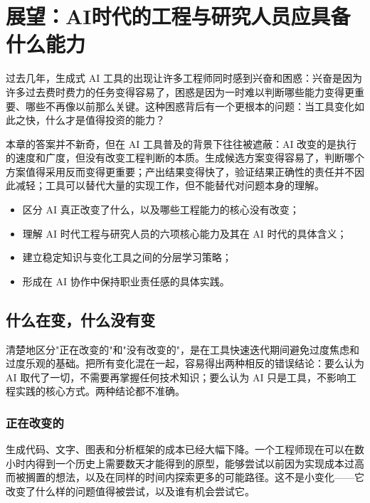 \chapter{展望：AI时代的工程与研究人员应具备什么能力}

过去几年，生成式 AI 工具的出现让许多工程师同时感到兴奋和困惑：兴奋是因为许多过去费时费力的任务变得容易了，困惑是因为一时难以判断哪些能力变得更重要、哪些不再像以前那么关键。这种困惑背后有一个更根本的问题：当工具变化如此之快，什么才是值得投资的能力？

本章的答案并不新奇，但在 AI 工具普及的背景下往往被遮蔽：AI 改变的是执行的速度和广度，但没有改变工程判断的本质。生成候选方案变得容易了，判断哪个方案值得采用反而变得更重要；产出结果变得快了，验证结果正确性的责任并不因此减轻；工具可以替代大量的实现工作，但不能替代对问题本身的理解。

\begin{chapterguide}
\begin{itemize}
  \item 区分 AI 真正改变了什么，以及哪些工程能力的核心没有改变；
  \item 理解 AI 时代工程与研究人员的六项核心能力及其在 AI 时代的具体含义；
  \item 建立稳定知识与变化工具之间的分层学习策略；
  \item 形成在 AI 协作中保持职业责任感的具体实践。
\end{itemize}
\end{chapterguide}

\section{什么在变，什么没有变}

清楚地区分"正在改变的"和"没有改变的"，是在工具快速迭代期间避免过度焦虑和过度乐观的基础。把所有变化混在一起，容易得出两种相反的错误结论：要么认为 AI 取代了一切，不需要再掌握任何技术知识；要么认为 AI 只是工具，不影响工程实践的核心方式。两种结论都不准确。

\subsection{正在改变的}

生成代码、文字、图表和分析框架的成本已经大幅下降。一个工程师现在可以在数小时内得到一个历史上需要数天才能得到的原型，能够尝试以前因为实现成本过高而被搁置的想法，以及在同样的时间内探索更多的可能路径。这不是小变化——它改变了什么样的问题值得被尝试，以及谁有机会尝试它。

